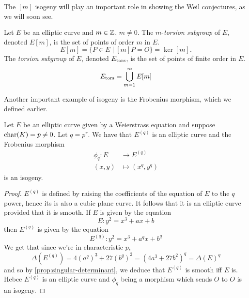 The $[m]$ isogeny will play an important role in showing the
Weil conjectures, as we will soon see.


\begin{definition}
	Let $E$ be an elliptic curve and $m \in \mathbb{Z}$, $m \neq 0$. The
	$m$-\emph{torsion subgroup} of $E$, denoted $E[m]$, is the set of
	points of order $m$ in $E$.
	\begin{equation*}
		E[m] = \{P \in E \mid [m]P = O\} = \ker[m].
	\end{equation*}
	The \emph{torsion subgroup} of $E$, denoted $E_{\operatorname{tors}}$, is the set of
	points of finite order in $E$.
	\begin{equation*}
		E_{\operatorname{tors}} = \bigcup_{m=1}^\infty E[m]
	\end{equation*}
\end{definition}


Another important example of isogeny is the Frobenius morphism, which we defined
earlier.
\begin{proposition}
	Let $E$ be an elliptic curve given by a Weierstrass equation
	and suppose $\operatorname{char}(K) = p \neq 0$. Let
	$q = p^r$. We have that $E^{(q)}$ is an elliptic curve and
	the Frobenius morphism
	\begin{align*}
		\phi_q: E &\to E^{(q)}\\
		(x, y)&\mapsto (x^q, y^q)
	\end{align*}
	is an isogeny.
\end{proposition}
\begin{proof}
	$E^{(q)}$ is defined by raising the coefficients of the equation of $E$
	to the $q$ power, hence its is also a cubic plane curve.
	It follows that it is an elliptic curve provided that it is smooth.
	If $E$ is given by the equation
	\begin{equation*}
		E: y^2 = x^3 + ax + b
	\end{equation*}
	then $E^{(q)}$ is given by the equation
	\begin{equation*}
		E^{(q)}: y^2 = x^3 + a^qx + b^q
	\end{equation*}
	We get that since we're in characteristic $p$,
	\begin{equation*}
		\Delta(E^{(q)}) = 4\left(a^q\right)^3 + 27\left(b^q\right)^2
		= \left(4a^3 + 27b^2\right)^q
		= \Delta(E)^q
	\end{equation*}
	and so by \ref{prop:singular-determinant}, we deduce that
	$E^{(q)}$ is smooth iff $E$ is.
	Hebce $E^{(q)}$ is an elliptic curve and $\phi_q$ being a morphism
	which sends $O$ to $O$ is an isogeny.
\end{proof}

